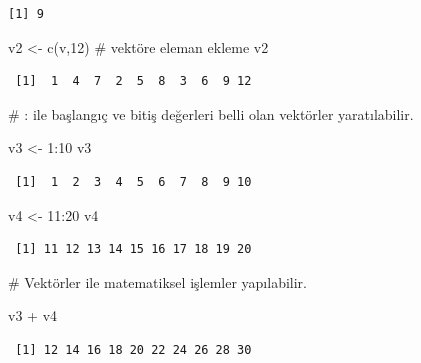 \documentclass[
  letterpaper,
  DIV=11,
  numbers=noendperiod]{scrreprt}
\newenvironment{Shaded}{\begin{snugshade}}{\end{snugshade}}
\newcommand{\CommentTok}[1]{\textcolor[rgb]{0.37,0.37,0.37}{#1}}
\newcommand{\DecValTok}[1]{\textcolor[rgb]{0.68,0.00,0.00}{#1}}
\newcommand{\FunctionTok}[1]{\textcolor[rgb]{0.28,0.35,0.67}{#1}}
\newcommand{\NormalTok}[1]{\textcolor[rgb]{0.00,0.23,0.31}{#1}}
\newcommand{\OtherTok}[1]{\textcolor[rgb]{0.00,0.23,0.31}{#1}}
\newcommand{\SpecialCharTok}[1]{\textcolor[rgb]{0.37,0.37,0.37}{#1}}
\begin{document}
\begin{verbatim}
[1] 9
\end{verbatim}

\begin{Shaded}
\begin{Highlighting}[]
\NormalTok{v2 }\OtherTok{\textless{}{-}} \FunctionTok{c}\NormalTok{(v,}\DecValTok{12}\NormalTok{) }\CommentTok{\# vektöre eleman ekleme}
\NormalTok{v2}
\end{Highlighting}
\end{Shaded}

\begin{verbatim}
 [1]  1  4  7  2  5  8  3  6  9 12
\end{verbatim}

\begin{Shaded}
\begin{Highlighting}[]
\CommentTok{\# : ile başlangıç ve bitiş değerleri belli olan vektörler yaratılabilir.}

\NormalTok{v3 }\OtherTok{\textless{}{-}} \DecValTok{1}\SpecialCharTok{:}\DecValTok{10}
\NormalTok{v3}
\end{Highlighting}
\end{Shaded}

\begin{verbatim}
 [1]  1  2  3  4  5  6  7  8  9 10
\end{verbatim}

\begin{Shaded}
\begin{Highlighting}[]
\NormalTok{v4 }\OtherTok{\textless{}{-}} \DecValTok{11}\SpecialCharTok{:}\DecValTok{20}
\NormalTok{v4}
\end{Highlighting}
\end{Shaded}

\begin{verbatim}
 [1] 11 12 13 14 15 16 17 18 19 20
\end{verbatim}

\begin{Shaded}
\begin{Highlighting}[]
\CommentTok{\# Vektörler ile matematiksel işlemler yapılabilir.}

\NormalTok{v3 }\SpecialCharTok{+}\NormalTok{ v4}
\end{Highlighting}
\end{Shaded}

\begin{verbatim}
 [1] 12 14 16 18 20 22 24 26 28 30
\end{verbatim}
\end{document}

